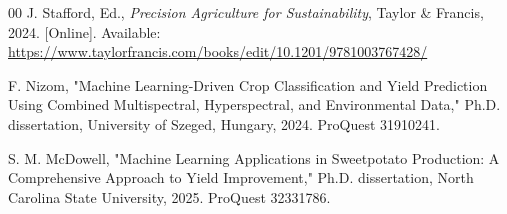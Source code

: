 \documentclass[10pt,twocolumn]{article}
\begin{document}
\begin{thebibliography}{00}
 J. Stafford, Ed., \textit{Precision Agriculture for Sustainability}, Taylor \& Francis, 2024. [Online]. Available: \url{https://www.taylorfrancis.com/books/edit/10.1201/9781003767428/}

 F. Nizom, "Machine Learning-Driven Crop Classification and Yield Prediction Using Combined Multispectral, Hyperspectral, and Environmental Data," Ph.D. dissertation, University of Szeged, Hungary, 2024. ProQuest 31910241.

 S. M. McDowell, "Machine Learning Applications in Sweetpotato Production: A Comprehensive Approach to Yield Improvement," Ph.D. dissertation, North Carolina State University, 2025. ProQuest 32331786.

\end{thebibliography}
\end{document}
